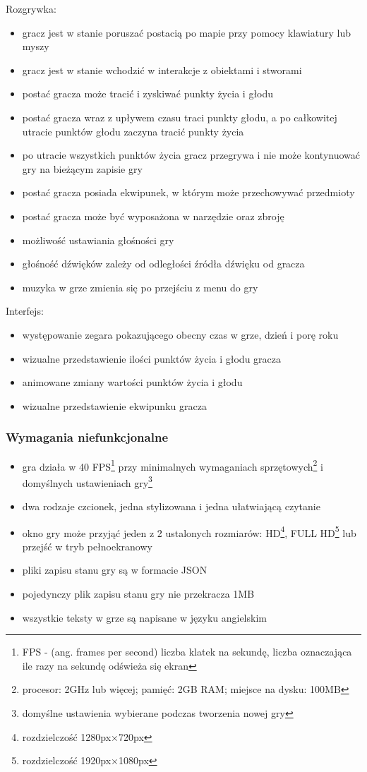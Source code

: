 \documentclass{article}
\begin{document}
Rozgrywka:
\begin{itemize}
    \item gracz jest w stanie poruszać postacią po mapie przy pomocy klawiatury lub myszy
    \item gracz jest w stanie wchodzić w interakcje z obiektami i stworami
    \item postać gracza może tracić i zyskiwać punkty życia i głodu
    \item postać gracza wraz z upływem czasu traci punkty głodu, a po całkowitej utracie punktów głodu zaczyna tracić punkty życia
    \item po utracie wszystkich punktów życia gracz przegrywa i nie może kontynuować gry na bieżącym zapisie gry
    \item postać gracza posiada ekwipunek, w którym może przechowywać przedmioty
    \item postać gracza może być wyposażona w narzędzie oraz zbroję
    \item możliwość ustawiania głośności gry
    \item głośność dźwięków zależy od odległości źródła dźwięku od gracza
    \item muzyka w grze zmienia się po przejściu z menu do gry
\end{itemize}
Interfejs:
\begin{itemize}
    \item występowanie zegara pokazującego obecny czas w grze, dzień i porę roku
    \item wizualne przedstawienie ilości punktów życia i głodu gracza
    \item animowane zmiany wartości punktów życia i głodu
    \item wizualne przedstawienie ekwipunku gracza
\end{itemize}

\subsubsection{Wymagania niefunkcjonalne}
\begin{itemize}
    \item gra działa w 40 FPS\footnote{FPS - (ang. frames per second) liczba klatek na sekundę, liczba oznaczająca ile razy na sekundę odświeża się ekran\cite{wiki:fps}} przy minimalnych wymaganiach sprzętowych\footnote{procesor: 2GHz lub więcej; pamięć: 2GB RAM; miejsce na dysku: 100MB} i domyślnych ustawieniach gry\footnote{domyślne ustawienia wybierane podczas tworzenia nowej gry}
    \item dwa rodzaje czcionek, jedna stylizowana i jedna ułatwiającą czytanie
    \item okno gry może przyjąć jeden z 2 ustalonych rozmiarów: HD\footnote{rozdzielczość 1280px×720px}, FULL HD\footnote{rozdzielczość 1920px×1080px} lub przejść w tryb pełnoekranowy
    \item pliki zapisu stanu gry są w formacie JSON
    \item pojedynczy plik zapisu stanu gry nie przekracza 1MB
    \item wszystkie teksty w grze są napisane w języku angielskim
\end{itemize}
\end{document}
